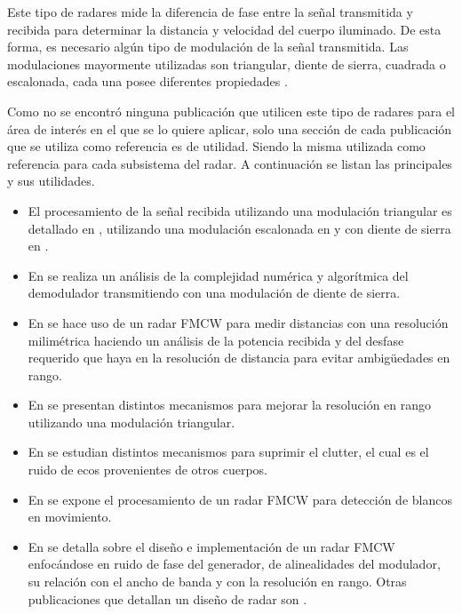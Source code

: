 Este tipo de radares mide la diferencia de fase entre la señal transmitida y recibida para determinar la distancia y velocidad del cuerpo iluminado. De esta forma, es necesario algún tipo de modulación de la señal transmitida. Las modulaciones mayormente utilizadas son triangular, diente de sierra, cuadrada o escalonada, cada una posee diferentes propiedades \cite{Basics2015}.

Como no se encontró ninguna publicación que utilicen este tipo de radares para el área de interés en el que se lo quiere aplicar, solo una sección de cada publicación que se utiliza como referencia es de utilidad. Siendo la misma utilizada como referencia para cada subsistema del radar. A continuación se listan las principales y sus utilidades.

\begin{itemize}

    \item El procesamiento de la señal recibida utilizando una modulación triangular es detallado en \cite{Chang2006}, utilizando una modulación escalonada en \cite{steppedFreq} y con diente de sierra en \cite{Shen, Varavin2007a}.

    \item En \cite{Shen} se realiza un análisis de la complejidad numérica y algorítmica del demodulador transmitiendo con una modulación de diente de sierra.

    \item En \cite{Brennan2014a} se hace uso de un radar FMCW para medir distancias con una resolución milimétrica haciendo un análisis de la potencia recibida y del desfase requerido que haya en la resolución de distancia para evitar ambigüedades en rango.

    \item En \cite{Kurt2007} se presentan distintos mecanismos para mejorar la resolución en rango utilizando una modulación triangular.

    \item En \cite{Kurt2007, LeChevalier2011} se estudian distintos mecanismos para suprimir el clutter, el cual es el ruido de ecos provenientes de otros cuerpos.

    \item En \cite{Lipa1990} se expone el procesamiento de un radar FMCW para detección de blancos en movimiento.

    \item En \cite{Brooker2005} se detalla sobre el diseño e implementación de un radar FMCW enfocándose en ruido de fase del generador, de alinealidades del modulador, su relación con el ancho de banda y con la resolución en rango. Otras publicaciones que detallan un diseño de radar son \cite{Chan2009, Wavemaker2015}. 

\end{itemize}
